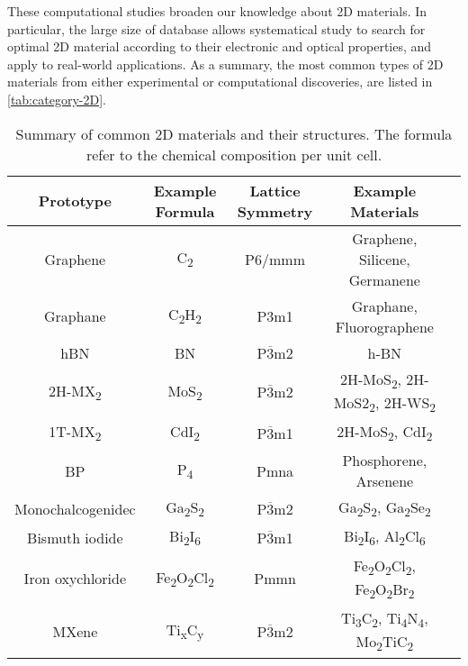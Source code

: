 These computational studies broaden our knowledge about 2D
materials. In particular, the large size of database allows
systematical study to search for optimal 2D material according to
their electronic and optical properties, and apply to real-world
applications. As a summary, the most common types of 2D materials from
either experimental or computational discoveries, are listed in
\autoref{tab:category-2D}.

\begin{table}
  \centering
  \caption{Summary of common 2D materials and their structures. The
    formula refer to the chemical composition per unit cell.}
  \label{tab:category-2D}
  \begin{tabular}{ccccc}
  \hline
  Prototype  & Example Formula  & Lattice Symmetry & Example Materials \\
  \hline
  Graphene & C\textsubscript{2} &  P6/mmm & Graphene, Silicene, Germanene \\
  Graphane & C\textsubscript{2}H\textsubscript{2} &  P3m1 & Graphane, Fluorographene\\
  hBN      & BN                & P$\overline{3}$m2 & h-BN \\
  2H-MX\textsubscript{2} & MoS\textsubscript{2} & P$\overline{3}$m2 & 2H-MoS\textsubscript{2}, 2H-MoS2\textsubscript{2}, 2H-WS\textsubscript{2} \\
  1T-MX\textsubscript{2} & CdI\textsubscript{2} & P$\overline{3}$m1 & 2H-MoS\textsubscript{2}, CdI\textsubscript{2}\\
  BP & P\textsubscript{4} & Pmna & Phosphorene, Arsenene \\
  Monochalcogenidec & Ga\textsubscript{2}S\textsubscript{2} & P$\overline{3}$m2 & Ga\textsubscript{2}S\textsubscript{2}, Ga\textsubscript{2}Se\textsubscript{2} \\
  Bismuth iodide &  Bi\textsubscript{2}I\textsubscript{6} & P$\overline{3}$m1 & Bi\textsubscript{2}I\textsubscript{6}, Al\textsubscript{2}Cl\textsubscript{6} \\
    Iron oxychloride                &  Fe\textsubscript{2}O\textsubscript{2}Cl\textsubscript{2} & Pmmn & Fe\textsubscript{2}O\textsubscript{2}Cl\textsubscript{2}, Fe\textsubscript{2}O\textsubscript{2}Br\textsubscript{2}  \\
  MXene & Ti\textsubscript{x}C\textsubscript{y} & P$\overline{3}$m2 & Ti\textsubscript{3}C\textsubscript{2}, Ti\textsubscript{4}N\textsubscript{4}, Mo\textsubscript{2}TiC\textsubscript{2} \\
  \hline
\end{tabular}
\end{table}



